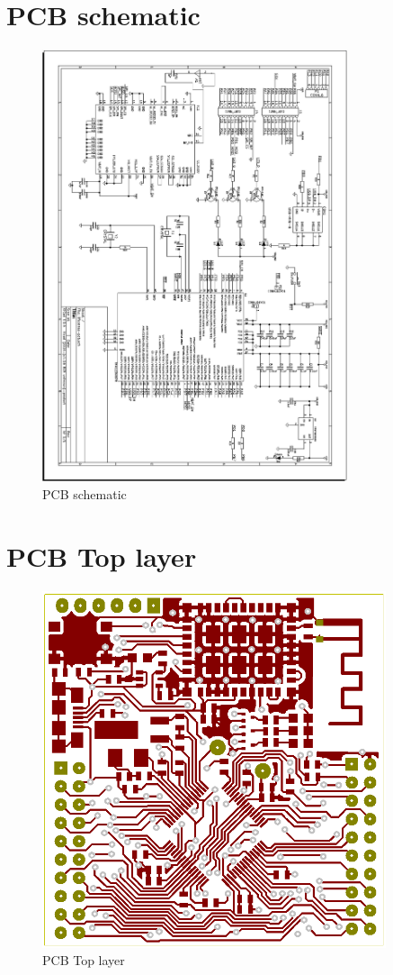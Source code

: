 \documentclass[letterpaper, 12 pt]{article}
\begin{document}
\section{PCB schematic}
\begin{figure}[H]
\centering
\includegraphics[width=0.8\textwidth]{schematic.png}
\caption{PCB schematic}
\end{figure}

\newpage
\section{PCB Top layer}
\begin{figure}[H]
\centering
\includegraphics[width=0.9\textwidth]{front.png}
\caption{PCB Top layer}
\end{figure}
\end{document}
